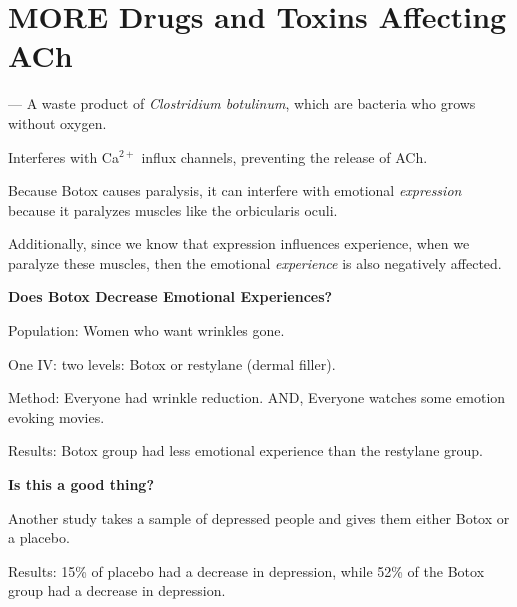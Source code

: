 
\section{MORE Drugs and Toxins Affecting ACh}

\begin{coloredlist}
    \item {} — A waste product of \textit{Clostridium botulinum}, which are bacteria who grows without oxygen.
    \begin{coloredlist}
        \item Interferes with Ca\(^{2+}\) influx channels, preventing the release of ACh.
        \item Because Botox causes paralysis, it can interfere with emotional \textit{expression} because it paralyzes muscles like the orbicularis oculi.
        \item Additionally, since we know that expression influences experience, when we paralyze these muscles, then the emotional \textit{experience} is also negatively affected.
        \item \textbf{Does Botox Decrease Emotional Experiences?}
        \begin{coloredlist}
            \item Population: Women who want wrinkles gone.
            \item One IV: two levels: Botox or restylane (dermal filler).
            \item Method: Everyone had wrinkle reduction. AND, Everyone watches some emotion evoking movies.
            \item Results: Botox group had less emotional experience than the restylane group.
            \item \textbf{Is this a good thing?}
            \begin{coloredlist}
                \item Another study takes a sample of depressed people and gives them either Botox or a placebo.
                \item Results: 15\% of placebo had a decrease in depression, while 52\% of the Botox group had a decrease in depression.
            \end{coloredlist}
        \end{coloredlist}

\end{coloredlist}
\end{coloredlist}
